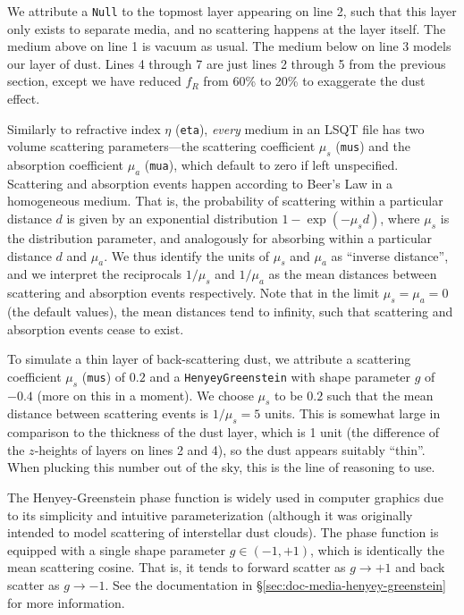 \documentclass[
    twoside,
    twocolumn,
    letterpaper,
    10pt]{article}
\newcommand\namett[2]{{\color{code#1}\texttt{#2}}}
\begin{document}
We attribute a \namett{purple}{Null} to the topmost layer appearing
on line 2, such that this layer only exists to separate media, and 
no scattering happens at the layer itself. The medium above on line 1 
is vacuum as usual. The medium below on line 3 models our layer of dust.
Lines 4 through 7 are just lines 2 through 5 from the previous
section, except we have reduced $f_R$ from 60\% to 20\% to exaggerate
the dust effect.

Similarly to refractive index $\eta$ (\texttt{eta}), \emph{every} 
medium in an LSQT file has two volume scattering parameters---the 
scattering coefficient $\mu_s$ (\texttt{mus}) and the absorption 
coefficient $\mu_a$ (\texttt{mua}), which default to zero if 
left unspecified. Scattering and absorption events happen according
to Beer's Law in a homogeneous medium. That is, the probability of 
scattering within a particular distance $d$ is given by an exponential 
distribution $1 - \exp{(-\mu_s d)}$, where $\mu_s$ is the distribution 
parameter, and analogously for absorbing within a particular distance 
$d$ and $\mu_a$. We thus identify the units of $\mu_s$ and $\mu_a$ as 
``inverse distance'', and we interpret the reciprocals $1/\mu_s$ and 
$1/\mu_a$ as the mean distances between scattering and absorption events
respectively. Note that in the limit $\mu_s = \mu_a = 0$ (the default values),
the mean distances tend to infinity, such that scattering and absorption events
cease to exist.

To simulate a thin layer of back-scattering dust, 
we attribute a scattering coefficient $\mu_s$ (\texttt{mus}) of $0.2$ and 
a \namett{purple}{HenyeyGreenstein} with shape parameter $g$ of $-0.4$
(more on this in a moment). We choose $\mu_s$ to be $0.2$ such that the mean 
distance between scattering events is $1/\mu_s = 5$ units. This is somewhat 
large in comparison to the thickness of the dust layer, which is 1 unit 
(the difference of the $z$-heights of layers on lines 2 and 4), so the dust
appears suitably ``thin''. When plucking this number out of the sky, this is 
the line of reasoning to use. 

The Henyey-Greenstein phase function is widely used in computer graphics
due to its simplicity and intuitive parameterization (although it was 
originally intended to model scattering of interstellar dust clouds). The
phase function is equipped with a single shape parameter $g \in (-1, +1)$,
which is identically the mean scattering cosine. That is, it tends to
forward scatter as $g \to +1$ and back scatter as $g \to -1$. See the
documentation in \S\ref{sec:doc-media-henyey-greenstein} for more
information.
\end{document}
